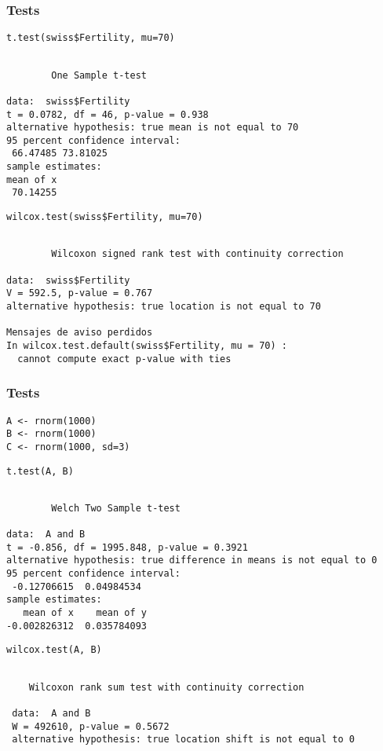 \documentclass{beamer}
\begin{document}
\begin{frame}[fragile]
\frametitle{Tests}
\label{sec-2-5}



\lstset{language=R}
\begin{lstlisting}
t.test(swiss$Fertility, mu=70)
\end{lstlisting}


\begin{verbatim}

        One Sample t-test

data:  swiss$Fertility 
t = 0.0782, df = 46, p-value = 0.938
alternative hypothesis: true mean is not equal to 70 
95 percent confidence interval:
 66.47485 73.81025 
sample estimates:
mean of x 
 70.14255
\end{verbatim}


\lstset{language=R}
\begin{lstlisting}
wilcox.test(swiss$Fertility, mu=70)
\end{lstlisting}


\begin{verbatim}

        Wilcoxon signed rank test with continuity correction

data:  swiss$Fertility 
V = 592.5, p-value = 0.767
alternative hypothesis: true location is not equal to 70 

Mensajes de aviso perdidos
In wilcox.test.default(swiss$Fertility, mu = 70) :
  cannot compute exact p-value with ties
\end{verbatim}
\end{frame}
\begin{frame}[fragile]
\frametitle{Tests}
\label{sec-2-6}


\lstset{language=R}
\begin{lstlisting}
A <- rnorm(1000)
B <- rnorm(1000)
C <- rnorm(1000, sd=3)
\end{lstlisting}



\lstset{language=R}
\begin{lstlisting}
t.test(A, B)
\end{lstlisting}


\begin{verbatim}

        Welch Two Sample t-test

data:  A and B 
t = -0.856, df = 1995.848, p-value = 0.3921
alternative hypothesis: true difference in means is not equal to 0 
95 percent confidence interval:
 -0.12706615  0.04984534 
sample estimates:
   mean of x    mean of y 
-0.002826312  0.035784093
\end{verbatim}


\lstset{language=R}
\begin{lstlisting}
wilcox.test(A, B)
\end{lstlisting}

\begin{verbatim}
 
 	Wilcoxon rank sum test with continuity correction
 
 data:  A and B 
 W = 492610, p-value = 0.5672
 alternative hypothesis: true location shift is not equal to 0
\end{verbatim}
\end{frame}
\end{document}
